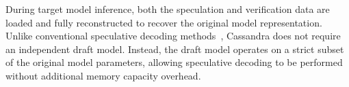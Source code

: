 During target model inference, both the speculation and verification data are loaded and fully reconstructed to recover the original model representation. Unlike conventional speculative decoding methods~\cite{speculativesampling, eagle3}, Cassandra does not require an independent draft model. Instead, the draft model operates on a strict subset of the original model parameters, allowing speculative decoding to be performed without additional memory capacity overhead.





